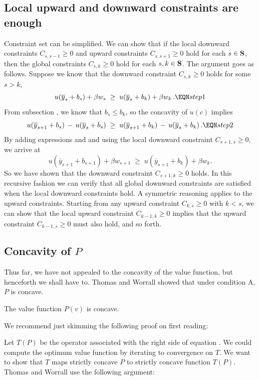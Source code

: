 \subsection{Local upward and downward constraints are enough}

Constraint set  can be simplified. We can show
that if the local downward constraints
$C_{s,s-1}\geq 0$ and upward constraints $C_{s,s+1}\geq 0$ hold for
each $s\in {\bf S}$, then the global constraints $C_{s,k}\geq 0$
hold for each $s,k\in {\bf S}$. The argument goes as follows. Suppose
we know that the downward constraint $C_{s,k}\geq 0$ holds for some
$s>k$,
$$
u(\overline y_s + b_s) + \beta w_s \;\geq\; u(\overline y_s + b_k) + \beta w_k\,.  \EQN step1
$$
From subsection , we know that $b_s\leq b_k$, so the concavity of $u(c)$ implies
$$
u(\overline y_{s+1} + b_s) \,-\, u(\overline y_s + b_s) \;\geq\;
u(\overline y_{s+1} + b_k) \,-\, u(\overline y_s + b_k)\,.                         \EQN step2
$$
By adding expressions  and  and using the local
downward constraint $C_{s+1,s}\geq 0$, we arrive at
$$
u(\overline y_{s+1} + b_{s+1}) + \beta w_{s+1} \;\geq\; u(\overline
 y_{s+1} + b_k) + \beta w_k .
$$
So we have shown that the downward constraint $C_{s+1,k}\geq 0$ holds.
In this recursive fashion we can verify that all global downward
constraints are satisfied when  the local downward constraints
hold. A symmetric reasoning applies to the upward constraints. Starting
from any upward constraint $C_{k,s}\geq 0$ with $k<s$, we can show that
the local upward constraint $C_{k-1,k}\geq 0$ implies that the upward
constraint $C_{k-1,s}\geq 0$ must also hold, and so forth.


\subsection{Concavity of $P$}

Thus far, we have not appealed to the concavity of the value function,
but henceforth we shall have to.  Thomas and Worrall
showed that under condition A, $P$ is concave.
\medskip

The value function $P(v)$ is concave.


\medskip\noindent
We recommend just skimming the following proof on first reading:

\medskip
{}
 Let $T(P)$ be the operator associated with the right side of
equation .  We could compute the optimum value function by
iterating to convergence on $T$.  We want to show that
$T$ maps strictly concave $P$ to strictly concave function
$T(P)$.   Thomas and Worrall use the following argument:

